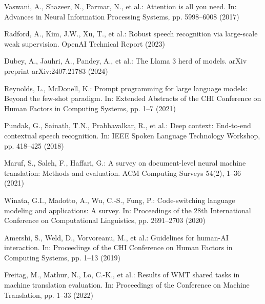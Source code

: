 \documentclass[twocolumn]{svjour3}
\begin{document}
\begin{thebibliography}{}

Vaswani, A., Shazeer, N., Parmar, N., et al.: Attention is all you need. In: Advances in Neural Information Processing Systems, pp. 5998--6008 (2017)

Radford, A., Kim, J.W., Xu, T., et al.: Robust speech recognition via large-scale weak supervision. OpenAI Technical Report (2023)

Dubey, A., Jauhri, A., Pandey, A., et al.: The Llama 3 herd of models. arXiv preprint arXiv:2407.21783 (2024)

Reynolds, L., McDonell, K.: Prompt programming for large language models: Beyond the few-shot paradigm. In: Extended Abstracts of the CHI Conference on Human Factors in Computing Systems, pp. 1--7 (2021)

Pundak, G., Sainath, T.N., Prabhavalkar, R., et al.: Deep context: End-to-end contextual speech recognition. In: IEEE Spoken Language Technology Workshop, pp. 418--425 (2018)

Maruf, S., Saleh, F., Haffari, G.: A survey on document-level neural machine translation: Methods and evaluation. ACM Computing Surveys 54(2), 1--36 (2021)

Winata, G.I., Madotto, A., Wu, C.-S., Fung, P.: Code-switching language modeling and applications: A survey. In: Proceedings of the 28th International Conference on Computational Linguistics, pp. 2691--2703 (2020)

Amershi, S., Weld, D., Vorvoreanu, M., et al.: Guidelines for human-AI interaction. In: Proceedings of the CHI Conference on Human Factors in Computing Systems, pp. 1--13 (2019)

Freitag, M., Mathur, N., Lo, C.-K., et al.: Results of WMT shared tasks in machine translation evaluation. In: Proceedings of the Conference on Machine Translation, pp. 1--33 (2022)

\end{thebibliography}
\end{document}
